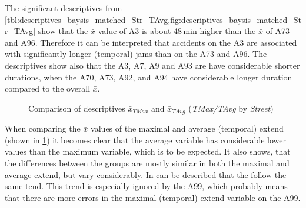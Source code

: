 The significant descriptives from \cref{tbl:descriptives_baysis_matched_Str_TAvg,fig:descriptives_baysis_matched_Str_TAvg} show that the $\bar{x}$ value of A3 is about 48\,min higher than the $\bar{x}$ of A73 and A96. Therefore it can be interpreted that accidents on the A3 are associated with significantly longer (temporal) jams than on the A73 and A96. The descriptives show also that the A3, A7, A9 and A93 are have considerable shorter durations, when the A70, A73, A92, and A94 have considerable longer duration compared to the overall $\bar{x}$.
\begin{figure}[ht!]
	\data
	\pgfplotstablesort[sort key=meanTAvg, sort cmp=float >]{\datasorted}{\data}
	\tiny
	\centering
	\caption{Comparison of descriptives $\bar{x}_{TMax}$ and $\bar{x}_{TAvg}$ (\textit{TMax/TAvg} by \textit{Street})}
	\label{fig:baysis_matched_meancomparison_Str_temporal}
\end{figure}
When comparing the $\bar{x}$ values of the maximal and average (temporal) extend (shown in \cref{fig:baysis_matched_meancomparison_Str_temporal}) it becomes clear that the average variable has considerable lower values than the maximum variable, which is to be expected. It also shows, that the differences between the groups are mostly similar in both the maximal and average extend, but vary considerably. In can be described that the follow the same tend. This trend is especially ignored by the A99, which probably means that there are more errors in the maximal (temporal) extend variable on the A99.

